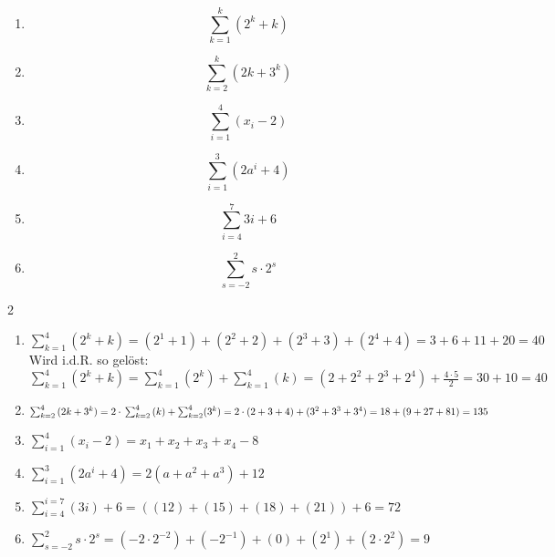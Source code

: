 {{
\begin{multicols}{2}
\begin{enumerate}[label=\alph*)]
 \item $$\sum_{k=1}^{k}{(2^k+k)}$$
 \item $$\sum_{k=2}^{k}{(2k+3^k)}$$
 \item $$\sum_{i=1}^{4}{(x_i-2)}$$
 \item $$\sum_{i=1}^{3}{(2a^i+4)}$$
 \item $$\sum_{i=4}^{7}3i + 6$$
 \item $$\sum_{s=-2}^{2}s\cdot{}2^s$$
\end{enumerate}
\end{multicols}{2}



}{%

\begin{enumerate}[label=\alph*)]
 \item $\sum_{k=1}^{4}{(2^k+k)} = (2^1+1) + (2^2+2) + (2^3+3) +
   (2^4+4) = 3 + 6 + 11 + 20 = 40$\\
   Wird i.d.R. so gelöst:\\
   $\sum_{k=1}^{4}{(2^k+k)} =
   \sum_{k=1}^{4}{(2^k)}+\sum_{k=1}^{4}{(k)} = (2+2^2+2^3+2^4) +
   \frac{4\cdot{}5}{2} = 30+10 = 40$

 \item $\sum_{k=2}^{4}{(2k+3^k)} = 2\cdot{}\sum_{k=2}^4{}(k) +
   \sum_{k=2}^4(3^k) = \\
   2\cdot{}(2+3+4) + (3^2+3^3+3^4) = 18 + (9+27+81) = 135$

 \item $\sum_{i=1}^{4}{(x_i-2)} = x_1+x_2+x_3+x_4 -8$
 \item $\sum_{i=1}^{3}{(2a^i+4)}  = 2(a + a^2 + a^3) + 12$
 \item $\sum_{i=4}^{i=7}(3i) + 6 = ((12) + (15) + (18) +(21) )+6=72$

 \item $\sum_{s=-2}^{2}s\cdot{}2^s = (-2\cdot{}2^{-2}) + (-2^{-1}) + (0) + (2^1) + (2\cdot{}2^2)=9$


\end{enumerate}}}
